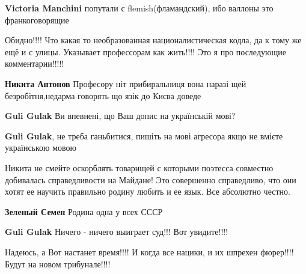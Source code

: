 \begin{itemize}
\begin{itemize}
\textbf{Victoria Manchini} попутали с flemish(фламандский), ибо валлоны это франкоговорящие\Smiley[1.0][yellow]
\end{itemize}



Обидно!!!! Что какая то необразованная националистическая кодла, да к тому же
ещё и с улицы. Указывает профессорам как жить!!!! Это я про последующие
комментарии!!!!!

\begin{itemize}

\textbf{Никита Антонов} Професору ніт прибиральниця вона наразі щей безробітня,недарма говорять що язік до Києва доведе


\textbf{Guli Gulak}
Ви впевнені, що Ваш допис на українській мові? \Laughey[1.0][white]


\textbf{Guli Gulak}, не треба ганьбитися, пишіть на мові агресора \Laughey[1.0][white] якщо не вмієте українською мовою


Никита не смейте оскорблять товарищей с которыми поэтесса совместно добивалась справедливости на Майдане! Это совершенно справедливо, что они хотят ее научить правильно родину любить и ее язык. Все абсолютно честно.


\textbf{Зеленый Семен} Родина одна у всех СССР


\textbf{Guli Gulak} Ничего - ничего выиграет суд!!! Вот увидите!!!!

Надеюсь, а Вот настанет время!!!! И когда все нацики, и их шпрехен фюрер!!!! Будут на новом трибунале!!!!
\end{itemize}


\end{itemize}
